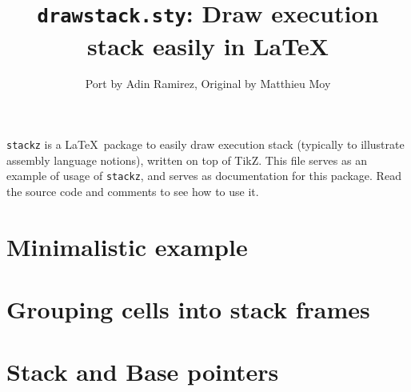 \documentclass{article}
\title{{\tt drawstack.sty}: Draw execution stack easily in \LaTeX}
\author{Port by Adin Ramirez, Original by Matthieu Moy}
\begin{document}
\maketitle

{\tt stackz} is a \LaTeX\ package to easily draw execution stack
(typically to illustrate assembly language notions), written on top of
TikZ. This file serves as an example of usage of {\tt stackz}, and
serves as documentation for this package. Read the source code and
comments to see how to use it.

\section{Minimalistic example}

\begin{drawstack}
  \cell{}
\end{drawstack}
%
\section{Grouping cells into stack frames}

\begin{drawstack}
  \startframe
  \separator[cell/.append style={line width=10pt}]
  \startframe
\end{drawstack}

\section{Stack and Base pointers}

\begin{drawstack}
  \startframe
  \startframe
   
   
   \esp \ebp
   
  \startframe
  \cell[address=0x0000 0000]{} 
  \cell{}
\end{drawstack}
\end{document}
